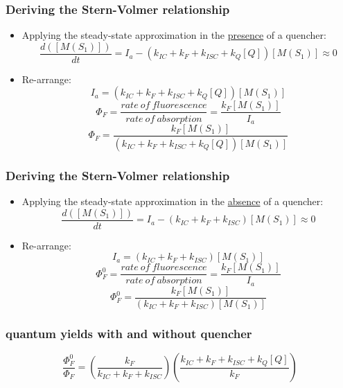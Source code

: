 \documentclass[a4paper,12pt,titlepage]{article}
\begin{document}
\begin{frame}
\frametitle{Deriving the Stern-Volmer relationship}
\begin{itemize}
\item<1-> Applying the steady-state approximation in the \underline{presence} of a quencher: \newline
\[ \frac{d([M(S_1)])}{dt} = I_a - (k_{IC} + k_F + k_{ISC} + k_Q[Q]) [M(S_1)] \approx 0\]
\item<2-> Re-arrange:\[ I_a = (k_{IC} + k_F + k_{ISC} + k_Q[Q])[M(S_1)] \]
\[\Phi_F = \frac{rate\ of\ fluorescence}{rate\ of\ absorption} = \frac{k_F[M(S_1)]}{I_a}\]
\[\Phi_F = \frac{k_F[M(S_1)]}{(k_{IC} + k_F + k_{ISC} + k_Q[Q])[M(S_1)]}\]
\begin{center}\end{center}
\end{itemize}
\end{frame}

\begin{frame}
\frametitle{Deriving the Stern-Volmer relationship}
\begin{itemize}
\item<1-> Applying the steady-state approximation in the \underline{absence} of a quencher: \newline
\[ \frac{d([M(S_1)])}{dt} = I_a - (k_{IC} + k_F + k_{ISC}) [M(S_1)] \approx 0\]
\item<2-> Re-arrange:\[ I_a = (k_{IC} + k_F + k_{ISC})[M(S_1)] \]
\[\Phi_F^0 = \frac{rate\ of\ fluorescence}{rate\ of\ absorption} = \frac{k_F[M(S_1)]}{I_a}\]
\[\Phi_F^0 = \frac{k_F[M(S_1)]}{(k_{IC} + k_F + k_{ISC})[M(S_1)]}\]
\begin{center} \end{center}
\end{itemize}
\end{frame}

\begin{frame}
\frametitle{quantum yields with and without quencher}
\[\frac{\Phi_F^0}{\Phi_F} = \left(\frac{k_F}{k_{IC} + k_F + k_{ISC}}\right)\left(\frac{k_{IC} + k_F + k_{ISC} + k_Q[Q]}{k_F}\right)\]



\end{frame}
\end{document}
